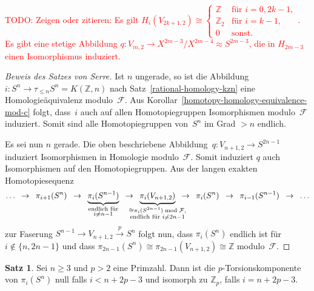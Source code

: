 \documentclass[11pt, a4paper, german]{article}
\theoremstyle{definition}
\newtheorem{satz}[lem]{Satz}
\theoremstyle{remark}
\newcommand{\TODO}[1]{\textcolor{red}{TODO: #1}} %
\newcommand{\R}{\mathbb{R}} %
\newcommand{\Z}{\mathbb{Z}} %
\newcommand{\F}{\mathcal{F}} %
\newcommand{\V}[2]{V_{{#2},{#1}}} %
\begin{document}
\TODO{Zeigen oder zitieren: Es gilt $H_i(\V{2}{2k+1}) \cong \begin{cases}
  \Z & \text{für } i = 0, 2k-1, \\
  \Z_2 & \text{für } i = k-1, \\
  0 & \text{sonst.}
\end{cases}$.
Es gibt eine stetige Abbildung $q : \V{2}{m} \to X^{2m-3} / X^{2m-4} \approx S^{2m-3}$, die in $H_{2m-3}$ einen Isomorphismus induziert.}

\begin{proof}[Beweis des Satzes von Serre]
  Ist $n$ ungerade, so ist die Abbildung $i : S^n \to \tau_{\leq n} S^n = K(\Z, n)$ nach Satz~\ref{rational-homology-kzn} eine Homologieäquivalenz modulo~$\F$.
  Aus Korollar~\ref{homotopy-homology-equivalence-mod-c} folgt, dass~$i$ auch auf allen Homotopiegruppen Isomorphismen modulo~$\F$ induziert.
  Somit sind alle Homotopiegruppen von~$S^n$ im Grad $> n$ endlich.

  Es sei nun $n$ gerade.
  Die oben beschriebene Abbildung~$q : \V{2}{n+1} \to S^{2n-1}$ induziert Isomorphismen in Homologie modulo~$\F$.
  Somit induziert $q$ auch Isomorphismen auf den Homotopiegruppen.
  Aus der langen exakten Homotopiesequenz
  \[
    \ldots
    \enspace\to\enspace
    \pi_{i+1}(S^n)
    \enspace\to\enspace
    \underbrace{\pi_i(S^{n-1})}_{\substack{\text{endlich für} \\ i \neq n-1}}
    \enspace\to\enspace \underbrace{\pi_i(\V{2}{n+1})}_{\mathclap{\substack{\cong \pi_i(S^{2n-1}) \bmod{\F}, \\ \text{endlich für } i \neq 2n-1}}}
    \enspace\to\enspace
    \pi_i(S^n)
    \enspace\to\enspace
    \pi_{i-1}(S^{n-1})
    \enspace\to\enspace
    \ldots
  \]
  zur Faserung $S^{n-1} \to \V{2}{n+1} \xrightarrow{p} S^n$ folgt nun, dass $\pi_i(S^n)$ endlich ist für $i \not\in \{ n, 2n-1 \}$ und dass $\pi_{2n-1}(S^n) \cong \pi_{2n-1}(\V{2}{n+1}) \cong \Z$ modulo~$\F$.
\end{proof}

\begin{satz}
  Sei $n \geq 3$ und $p > 2$ eine Primzahl.
  Dann ist die $p$-Torsionskomponente von $\pi_i(S^n)$ null falls $i < n + 2p - 3$ und isomorph zu $\Z_p$, falls $i = n + 2p - 3$.
\end{satz}
\end{document}
